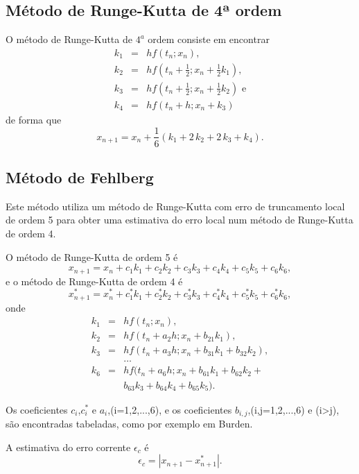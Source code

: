 \documentclass[brazilian, 10pt, a4paper, final]{article}
\begin{document}
\begin{multicols*}{2}
\subsection{Método de Runge-Kutta de 4ª ordem}
O método de Runge-Kutta de $4^{a}$ ordem consiste em encontrar
\begin{eqnarray}
 k_1&=&hf(t_n;x_n), \\
 k_2&=&hf\left(t_n+\frac{1}{2}; x_n +\frac{1}{2}k_1\right), \\
 k_3&=&hf\left(t_n+\frac{1}{2}; x_n +\frac{1}{2}k_2\right)\text{ e} \\
 k_4&=&hf\left(t_n+h; x_n + k_3\right) 
\end{eqnarray}
\noindent
de forma que
\begin{equation}
 x_{n+1}=x_{n}+\frac{1}{6}\left(k_1+2\,k_2+2\,k_3+k_4\right). 
\end{equation}


\subsection{Método de Fehlberg}
Este método utiliza um método de Runge-Kutta com erro de truncamento local de ordem 5 para obter uma estimativa do erro local num método de Runge-Kutta de ordem 4.

O método de Runge-Kutta de ordem 5 é
\begin{equation}
  x_{n+1}=x_n+c_1k_1+c_2k_2+c_3k_3+c_4k_4+c_5k_5+c_6k_6,
\end{equation}
e o  método de Runge-Kutta de ordem 4 é
\begin{equation}
  x_{n+1}^*=x_n^*+c_1^*k_1+c_2^*k_2+c_3^*k_3+c_4^*k_4+c_5^*k_5+c_6^*k_6,
\end{equation}
onde
\begin{eqnarray}
  k_1&=&hf(t_n;x_n),\\
  k_2&=&hf(t_n +a_2h;x_n+b_{21}k_1),\\
  k_3&=&hf(t_n +a_3h;x_n+b_{31}k_1+b_{32}k_2),\\
  \nonumber & & \dots \\
  k_6&=&hf(t_n+a_6h;x_n+b_{61}k_1+b_{62}k_2+\nonumber \\
     & &b_{63}k_3+b_{64}k_4+b_{65}k_5). 
\end{eqnarray}

Os coeficientes $c_i$,$c_i^*$ e $a_i$,(i=1,2,...,6), e os coeficientes $b_{i,j}$,(i,j=1,2,...,6) e (i>j), são encontradas tabeladas, como por exemplo em Burden.%

A estimativa do erro corrente $\epsilon_c$ é
\begin{equation}
  \epsilon_c=|x_{n+1}-x_{n+1}^*|.
\end{equation}


\end{multicols*}
\end{document}
